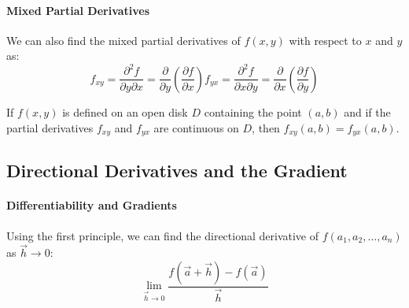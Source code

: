 \documentclass[11pt]{report}
\begin{document}
\paragraph{Mixed Partial Derivatives} We can also find the mixed partial derivatives of $f(x, y)$ with respect to $x$ and $y$ as:
\begin{subequations}
    \begin{equation}
    f_{xy} = \frac{\partial^2 f}{\partial y \partial x} = \frac{\partial}{\partial y} \left( \frac{\partial f}{\partial x} \right)
    \end{equation}
    \begin{equation}
    f_{yx} = \frac{\partial^2 f}{\partial x \partial y} = \frac{\partial}{\partial x} \left( \frac{\partial f}{\partial y} \right)
    \end{equation}
\end{subequations}
\begin{theorem}
    If $f(x, y)$ is defined on an open disk $D$ containing the point $(a, b)$ and if the partial derivatives $f_{xy}$ and $f_{yx}$ are continuous on $D$, then $f_{xy}(a, b) = f_{yx}(a, b)$.
\end{theorem}
\subsection{Directional Derivatives and the Gradient}
\paragraph{Differentiability and Gradients} Using the first principle, we can find the directional derivative of $f(a_1, a_2, \dots, a_n)$ as $\vec{h} \to 0$:
\begin{equation}
    \lim_{\vec{h} \to 0} \frac{f(\vec{a} + \vec{h}) - f(\vec{a})}{\vec{h}}
\end{equation}
\end{document}
